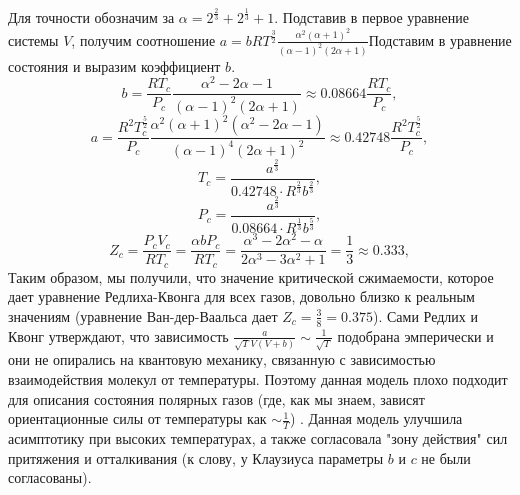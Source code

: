\documentclass[a4paper]{article}
\numberwithin{equation}{subsection} %
\begin{document}
Для точности обозначим за $\alpha = 2^{\frac{2}{3}} + 2^{\frac{1}{3}} + 1$.
Подставив в первое уравнение системы $V$, получим соотношение $a = bRT^{\frac{3}{2}}\frac{\alpha^2(\alpha+1)^2}{(\alpha-1)^2(2\alpha+1)}$Подставим в уравнение состояния и выразим коэффициент $b$.
\begin{equation*}
	b = \frac{RT_c}{P_c}\frac{\alpha^2-2\alpha-1}{(\alpha-1)^2(2\alpha+1)} \approx 0.08664\frac{RT_c}{P_c},
\end{equation*}
\begin{equation*}
	a = \frac{R^2T_c^{\frac{5}{2}}}{P_c}\frac{\alpha^2(\alpha+1)^2(\alpha^2-2\alpha-1)}{(\alpha-1)^4(2\alpha+1)^2} \approx 0.42748\frac{R^2T_c^{\frac{5}{2}}}{P_c},
\end{equation*}
\begin{equation*}
	T_c = \frac{a^{\frac{2}{3}}}{0.42748 \cdot R^{\frac{2}{3}}b^{\frac{2}{3}}},
\end{equation*}
\begin{equation*}
	P_c = \frac{a^{\frac{2}{3}}}{0.08664 \cdot R^{\frac{1}{3}}b^{\frac{5}{3}}},
\end{equation*}
\begin{equation*}
	Z_c = \frac{P_cV_c}{RT_c} = \frac{\alpha bP_c}{RT_c} = \frac{\alpha^3-2\alpha^2-\alpha}{2\alpha^3-3\alpha^2+1} = \frac{1}{3} \approx 0.333,
\end{equation*}
Таким образом, мы получили, что значение критической сжимаемости, которое дает уравнение Редлиха-Квонга для всех газов, довольно близко к реальным значениям (уравнение Ван-дер-Ваальса дает $Z_c = \frac{3}{8} = 0.375$).
Сами Редлих и Квонг утверждают, что зависимость $\frac{a}{\sqrt{T}V(V+b)} \sim \frac{1}{\sqrt{T}}$ подобрана эмперически и они не опирались на квантовую механику, связанную с зависимостью взаимодействия молекул от температуры. Поэтому данная модель плохо подходит для описания состояния полярных газов (где, как мы знаем, зависят ориентационные силы от температуры как $\sim \frac{1}{T}$) .
Данная модель улучшила асимптотику при высоких температурах, а также согласовала "зону действия" сил притяжения и отталкивания (к слову, у Клаузиуса параметры $b$ и $c$ не были согласованы).
\end{document}
